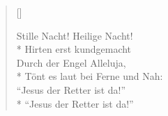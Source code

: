 \begin{verse}[\versewidth]
\begin{patverse}
 Stille Nacht! Heilige Nacht!\\*
Hirten erst kundgemacht \\
Durch der Engel Alleluja, \\*
Tönt es laut bei Ferne und Nah:\\
``Jesus der Retter ist da!''\\*
``Jesus der Retter ist da!''
\end{patverse}


\end{verse}



